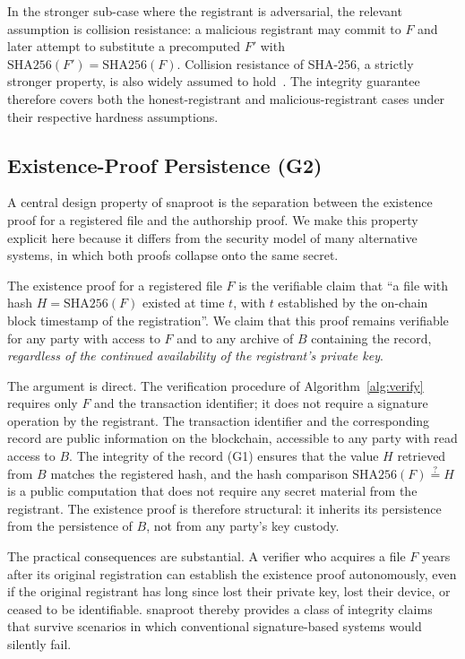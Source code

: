 \documentclass[11pt,a4paper]{article}
\begin{document}
In the stronger sub-case where the registrant is adversarial, the
relevant assumption is collision resistance: a malicious registrant
may commit to $F$ and later attempt to substitute a precomputed $F'$
with $\mathrm{SHA256}(F') = \mathrm{SHA256}(F)$. Collision resistance
of SHA-256, a strictly stronger property, is also widely assumed to
hold~\cite{nist2015fips180}. The integrity guarantee therefore covers
both the honest-registrant and malicious-registrant cases under
their respective hardness assumptions.

\subsection{Existence-Proof Persistence (G2)}
\label{sec:security:existence}

A central design property of snaproot is the separation between the
existence proof for a registered file and the authorship proof. We
make this property explicit here because it differs from the security
model of many alternative systems, in which both proofs collapse onto
the same secret.

The existence proof for a registered file $F$ is the verifiable claim
that ``a file with hash $H = \mathrm{SHA256}(F)$ existed at time $t$,
with $t$ established by the on-chain block timestamp of the
registration''. We claim that this proof remains verifiable for any
party with access to $F$ and to any archive of $B$ containing the
record, \emph{regardless of the continued availability of the
registrant's private key}.

The argument is direct. The verification procedure of
Algorithm~\ref{alg:verify} requires only $F$ and the transaction
identifier; it does not require a signature operation by the
registrant. The transaction identifier and the corresponding record
are public information on the blockchain, accessible to any party
with read access to $B$. The integrity of the record (G1) ensures that
the value $H$ retrieved from $B$ matches the registered hash, and the
hash comparison $\mathrm{SHA256}(F) \stackrel{?}{=} H$ is a public
computation that does not require any secret material from the
registrant. The existence proof is therefore structural: it inherits
its persistence from the persistence of $B$, not from any party's key
custody.

The practical consequences are substantial. A verifier who acquires a
file $F$ years after its original registration can establish the
existence proof autonomously, even if the original registrant has long
since lost their private key, lost their device, or ceased to be
identifiable. snaproot thereby provides a class of integrity claims
that survive scenarios in which conventional signature-based systems
would silently fail.
\end{document}
